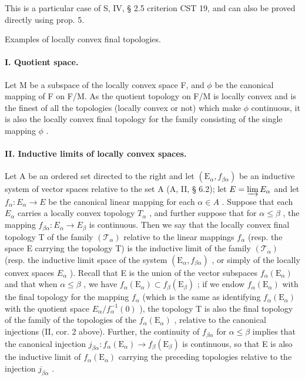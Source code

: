 This is a particular case of S, IV, § 2.5 criterion CST 19, and can also be proved directly using prop. 5.

Examples of locally convex final topologies.

\paragraph{I. Quotient space.}

Let M be a subspace of the locally convex space F, and \(\phi\) be the canonical mapping of F on F/M. As the quotient topology on F/M is locally convex and is the finest of all the topologies (locally convex or not) which make \(\phi\) continuous, it is also the locally convex final topology for the family consisting of the single mapping \(\phi\) .

\paragraph{II. Inductive limits of locally convex spaces.}

Let A be an ordered set directed to the right and let \((\mathrm{E}_{\alpha}, f_{\beta\alpha})\) be an inductive system of vector spaces relative to the set A (A, II, § 6.2); let \(E = \varinjlim E_{\alpha}\) and let \(f_{\alpha}: E_{\alpha} \to E\) be the canonical linear mapping for each \(\alpha \in A\) . Suppose that each \(E_{\alpha}\) carries a locally convex topology \(T_{\alpha}\) , and further suppose that for \(\alpha \leqslant \beta\) , the mapping \(f_{\beta\alpha}: E_{\alpha} \to E_{\beta}\) is continuous. Then we say that the locally convex final topology T of the family \((\mathcal{T}_{\alpha})\) relative to the linear mappings \(f_{\alpha}\) (resp. the space E carrying the topology T) is the inductive limit of the family \((\mathcal{T}_{\alpha})\) (resp. the inductive limit space of the system \((\mathrm{E}_{\alpha}, f_{\beta\alpha})\) , or simply of the locally convex spaces \(E_{\alpha}\) ). Recall that E is the union of the vector subspaces \(f_{\alpha}(\mathrm{E}_{\alpha})\) and that when \(\alpha \leqslant \beta\) , we have \(f_{\alpha}(\mathrm{E}_{\alpha}) \subset f_{\beta}(\mathrm{E}_{\beta})\) ; if we endow \(f_{\alpha}(\mathrm{E}_{\alpha})\) with the final topology for the mapping \(f_{\alpha}\) (which is the same as identifying \(f_{\alpha}(\mathrm{E}_{\alpha})\) with the quotient space \(E_{\alpha}/f_{\alpha}^{-1}(0)\) ), the topology T is also the final topology of the family of the topologies of the \(f_{\alpha}(\mathrm{E}_{\alpha})\) , relative to the canonical injections (II, cor. 2 above). Further, the continuity of \(f_{\beta\alpha}\) for \(\alpha \leqslant \beta\) implies that the canonical injection \(j_{\beta\alpha}: f_{\alpha}(\mathrm{E}_{\alpha}) \to f_{\beta}(\mathrm{E}_{\beta})\) is continuous, so that E is also the inductive limit of \(f_{\alpha}(\mathrm{E}_{\alpha})\) carrying the preceding topologies relative to the injection \(j_{\beta\alpha}\) .

